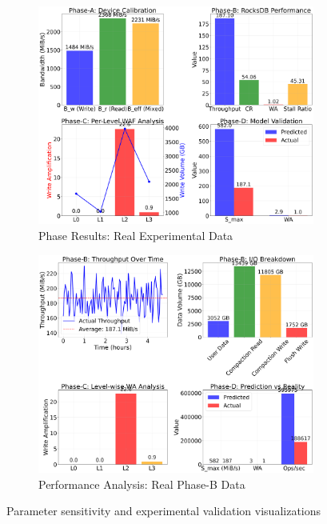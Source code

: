 \documentclass[11pt]{article}
\begin{document}
\begin{figure}[H]
\centering
\begin{subfigure}{0.48\textwidth}
\centering
\includegraphics[width=\textwidth]{experiments/2025-09-05/real_phase_results.png}
\caption{Phase Results: Real Experimental Data}
\label{fig:parameter_validation}
\end{subfigure}
\hfill
\begin{subfigure}{0.48\textwidth}
\centering
\includegraphics[width=\textwidth]{experiments/2025-09-05/real_performance_analysis.png}
\caption{Performance Analysis: Real Phase-B Data}
\label{fig:experimental_validation}
\end{subfigure}
\caption{Parameter sensitivity and experimental validation visualizations}
\end{figure}
\end{document}
